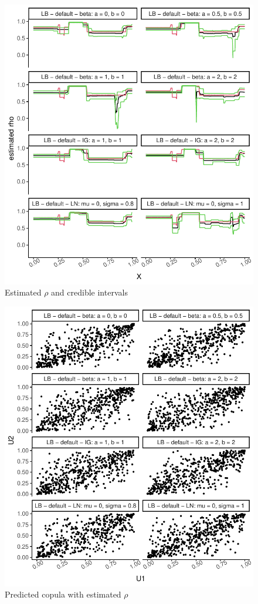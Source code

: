 \documentclass{amsart}
\begin{document}
\fi
\begin{figure}[ht]
	\centering
	\includegraphics[width=0.95\linewidth]{predicted_rho_1.pdf}
	\caption{Estimated $\rho$ and credible intervals}
	\label{fig:pred:rho:1}
\end{figure}

\begin{figure}[ht]
	\centering
	\includegraphics[width=0.95\linewidth]{simulated_copula_1.pdf}
	\caption{Predicted copula with estimated $\rho$}
	\label{fig:sim:copula:1}
\end{figure}
\end{document}
